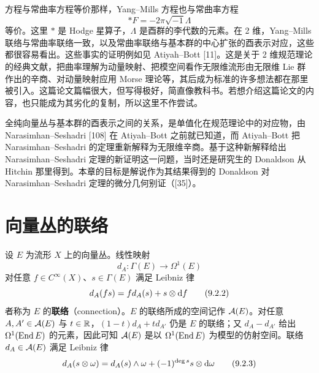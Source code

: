 方程与常曲率方程等价那样，Yang--Mills 方程也与常曲率方程
\begin{equation}
  *F = -2\pi\sqrt{-1}\Lambda
  \tag{9.1.5}
\end{equation}
等价。这里 $*$ 是 Hodge 星算子，$\Lambda$ 是酉群的李代数的元素。在 2 维，Yang--Mills 联络与常曲率联络一致，以及常曲率联络与基本群的中心扩张的酉表示对应，这些都很容易看出。这些事实的证明例如见 Atiyah--Bott [11]。这是关于 2 维规范理论的经典文献，把曲率理解为动量映射、把模空间看作无限维流形由无限维 Lie 群作出的辛商、对动量映射应用 Morse 理论等，其后成为标准的许多想法都在那里被引入。这篇论文篇幅很大，但写得极好，简直像教科书。若想介绍这篇论文的内容，也只能成为其劣化的复制，所以这里不作尝试。


全纯向量丛与基本群的酉表示之间的关系，是单值化在规范理论中的对应物，由 Narasimhan--Seshadri [108] 在 Atiyah--Bott 之前就已知道，而 Atiyah--Bott 把 Narasimhan--Seshadri 的定理重新解释为无限维辛商。基于这种新解释给出 Narasimhan--Seshadri 定理的新证明这一问题，当时还是研究生的 Donaldson 从 Hitchin 那里得到。本章的目标是解说作为其结果得到的 Donaldson 对 Narasimhan--Seshadri 定理的微分几何别证（[35]）。

\section{向量丛的联络}

设 $E$ 为流形 $X$ 上的向量丛。线性映射
\begin{equation}
  d_A\colon \Gamma(E) \to \Omega^1(E)
  \tag{9.2.1}
\end{equation}
对任意 $f\in C^\infty(X)$、$s\in\Gamma(E)$ 满足 Leibniz 律
\begin{equation}
  d_A(fs) = f d_A(s) + s\otimes \mathrm{d} f
  \tag{9.2.2}
\end{equation}
者称为 $E$ 的\textbf{联络}（connection）。$E$ 的联络所成的空间记作 $\mathcal{A}(E)$。对任意 $A,A'\in\mathcal{A}(E)$ 与 $t\in\mathbb{R}$，$(1-t)d_A + t d_{A'}$ 仍是 $E$ 的联络；又 $d_A - d_{A'}$ 给出 $\Omega^1(\operatorname{End} E)$ 的元素，因此可知 $\mathcal{A}(E)$ 是以 $\Omega^1(\operatorname{End} E)$ 为模型的仿射空间。联络 $d_A\in\mathcal{A}(E)$ 满足 Leibniz 律
\begin{equation}
  d_A(s\otimes \omega) = d_A(s)\wedge \omega + (-1)^{\deg s} s\otimes \mathrm{d}\omega
  \tag{9.2.3}
\end{equation}

